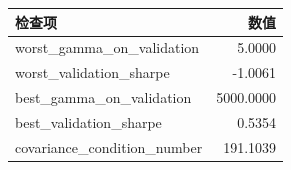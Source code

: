 \begin{center}
\small
\begin{tabular}{lr}
\toprule
检查项 & 数值 \\
\midrule
worst\_gamma\_on\_validation & 5.0000 \\
worst\_validation\_sharpe & -1.0061 \\
best\_gamma\_on\_validation & 5000.0000 \\
best\_validation\_sharpe & 0.5354 \\
covariance\_condition\_number & 191.1039 \\
\bottomrule
\end{tabular}
\end{center}